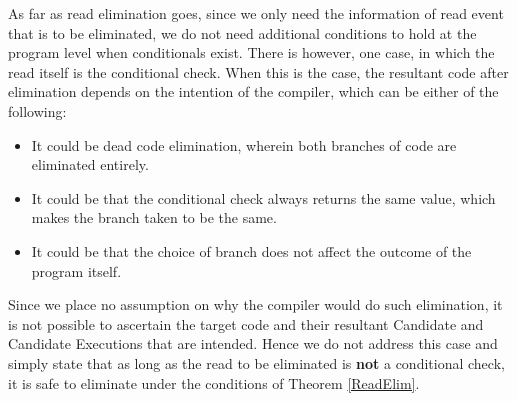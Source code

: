     As far as read elimination goes, since we only need the information of read event that is to be eliminated, we do not need additional conditions to hold at the program level when conditionals exist. 
    There is however, one case, in which the read itself is the conditional check. 
    When this is the case, the resultant code after elimination depends on the intention of the compiler, which can be either of the following:
    \begin{itemize}
        \item It could be dead code elimination, wherein both branches of code are eliminated entirely. 
        \item It could be that the conditional check always returns the same value, which makes the branch taken to be the same. 
        \item It could be that the choice of branch does not affect the outcome of the program itself. 
    \end{itemize}
    
    Since we place no assumption on why the compiler would do such elimination, it is not possible to ascertain the target code and their resultant Candidate and Candidate Executions that are intended. 
    Hence we do not address this case and simply state that as long as the read to be eliminated is \textbf{not} a conditional check, it is safe to eliminate under the conditions of Theorem \ref{ReadElim}. 
    